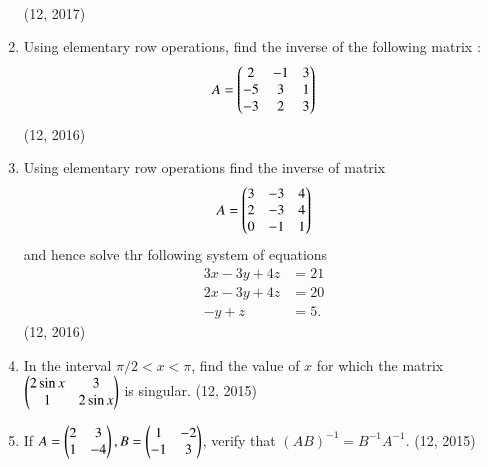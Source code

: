 \begin{enumerate}[label=\thesubsection.\arabic*,ref=\thesubsection.\theenumi]
\begin{align*}
\end{align*}
\hfill (12, 2017)
    \item Using elementary row operations, find the inverse of the following matrix :
          \begin{align*}
              A = \begin{pmatrix}2 & -1 & 3  \\
              -5           & 3  & 1  \\
              -3           & 2  & 3\end{pmatrix}
          \end{align*}
\hfill (12, 2016)
    \item Using elementary row operations find the inverse of matrix
          \begin{align*}
              A =\begin{pmatrix}3 & -3 & 4 \\2&-3&4\\0&-1&1\end{pmatrix}
          \end{align*}
          and hence solve thr following system of equations
          \begin{align*}
              3x-3y+4z & =21 \\
              2x-3y+4z & =20 \\
              -y+z     & =5.
          \end{align*}
\hfill (12, 2016)
\item In the interval ${\pi}/2<x<\pi$, find the value of $x$ for which the matrix $\begin{pmatrix}2\sin{x} & 3 \\ 1 & 2\sin{x}\end{pmatrix}$ is singular.
\hfill (12, 2015)
\item If $A = \begin{pmatrix}2&3\\1&-4\end{pmatrix}, B = \begin{pmatrix}1&-2\\-1&3\end{pmatrix}$, verify that $(AB)^{-1} = B^{-1}A^{-1}$. 
\hfill (12, 2015)

\end{enumerate}
